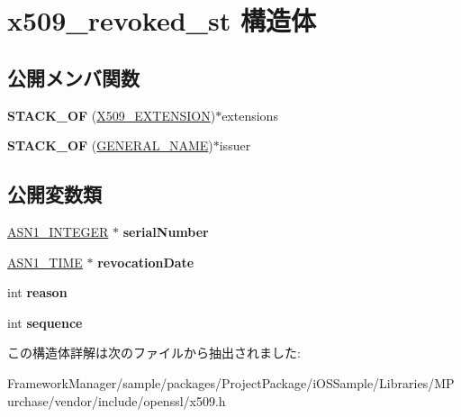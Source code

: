 \hypertarget{structx509__revoked__st}{}\section{x509\+\_\+revoked\+\_\+st 構造体}
\label{structx509__revoked__st}
\subsection*{公開メンバ関数}
\begin{DoxyCompactItemize}
\item 
\hypertarget{structx509__revoked__st_a7cda2324e28fdee169925d43cf9c4987}{}{\bfseries S\+T\+A\+C\+K\+\_\+\+O\+F} (\hyperlink{struct_x509__extension__st}{X509\+\_\+\+E\+X\+T\+E\+N\+S\+I\+O\+N})$\ast$extensions\label{structx509__revoked__st_a7cda2324e28fdee169925d43cf9c4987}

\item 
\hypertarget{structx509__revoked__st_a3bbf3ac238d169cff492184f23d0c182}{}{\bfseries S\+T\+A\+C\+K\+\_\+\+O\+F} (\hyperlink{struct_g_e_n_e_r_a_l___n_a_m_e__st}{G\+E\+N\+E\+R\+A\+L\+\_\+\+N\+A\+M\+E})$\ast$issuer\label{structx509__revoked__st_a3bbf3ac238d169cff492184f23d0c182}

\end{DoxyCompactItemize}
\subsection*{公開変数類}
\begin{DoxyCompactItemize}
\item 
\hypertarget{structx509__revoked__st_a3b638a3caba10ce8daf6992fdd13658c}{}\hyperlink{structasn1__string__st}{A\+S\+N1\+\_\+\+I\+N\+T\+E\+G\+E\+R} $\ast$ {\bfseries serial\+Number}\label{structx509__revoked__st_a3b638a3caba10ce8daf6992fdd13658c}

\item 
\hypertarget{structx509__revoked__st_a9a86c7c9efcdf5a3289123ea82da8268}{}\hyperlink{structasn1__string__st}{A\+S\+N1\+\_\+\+T\+I\+M\+E} $\ast$ {\bfseries revocation\+Date}\label{structx509__revoked__st_a9a86c7c9efcdf5a3289123ea82da8268}

\item 
\hypertarget{structx509__revoked__st_afc9d299c76450dd5f2937000b97795b2}{}int {\bfseries reason}\label{structx509__revoked__st_afc9d299c76450dd5f2937000b97795b2}

\item 
\hypertarget{structx509__revoked__st_a361a3358c3a578178e6482fc9a28ea86}{}int {\bfseries sequence}\label{structx509__revoked__st_a361a3358c3a578178e6482fc9a28ea86}

\end{DoxyCompactItemize}


この構造体詳解は次のファイルから抽出されました\+:\begin{DoxyCompactItemize}
\item 
Framework\+Manager/sample/packages/\+Project\+Package/i\+O\+S\+Sample/\+Libraries/\+M\+Purchase/vendor/include/openssl/x509.\+h\end{DoxyCompactItemize}
